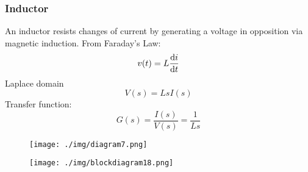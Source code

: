 \subsubsection{Inductor}
An inductor resists changes of current by generating a voltage in opposition via magnetic induction. From Faraday's Law:
\begin{equation}
  v(t) = L \frac{\dif i}{\dif t}
\end{equation}
Laplace domain
\begin{equation}
  V(s) = LsI(s)
\end{equation}
Transfer function:
\begin{equation}
  G(s) = \frac{I(s)}{V(s)} = \frac{1}{Ls}
\end{equation}
\begin{figure}[H]
  \centering
  \texttt{[image: ./img/diagram7.png]}
\end{figure}
\begin{figure}[H]
  \centering
  \texttt{[image: ./img/blockdiagram18.png]}
\end{figure}